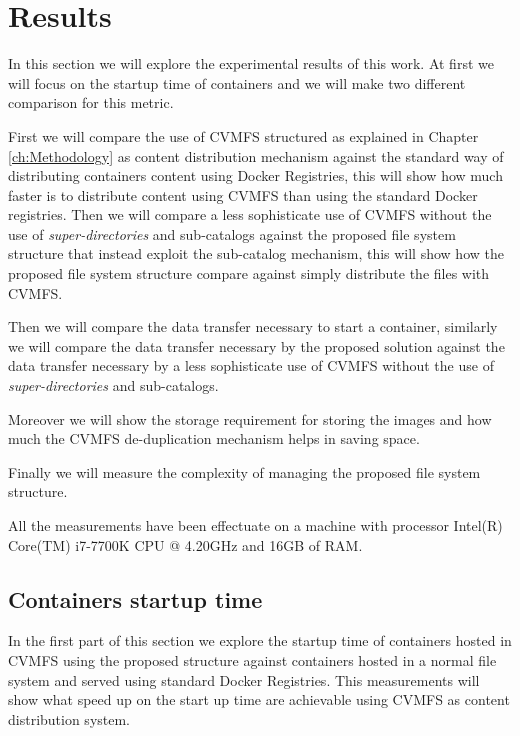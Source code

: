 \chapter{Results}\label{ch:Results}

In this section we will explore the experimental results of this work. At first
we will focus on the startup time of containers and we will make two different
comparison for this metric. 

First we will compare the use of CVMFS structured as explained in Chapter
\ref{ch:Methodology} as content distribution mechanism against the standard way
of distributing containers content using Docker Registries, this will show how
much faster is to distribute content using CVMFS than using the standard Docker
registries.  Then we will compare a less sophisticate use of CVMFS without the
use of \textit{super-directories} and sub-catalogs against the proposed file
system structure that instead exploit the sub-catalog mechanism, this will show
how the proposed file system structure compare against simply distribute the
files with CVMFS.

Then we will compare the data transfer necessary to start a container,
similarly we will compare the data transfer necessary by the proposed solution
against the data transfer necessary by a less sophisticate use of CVMFS without
the use of \textit{super-directories} and sub-catalogs.

Moreover we will show the storage requirement for storing the images and how
much the CVMFS de-duplication mechanism helps in saving space.

Finally we will measure the complexity of managing the proposed file system
structure.

All the measurements have been effectuate on a machine with processor Intel(R)
Core(TM) i7-7700K CPU @ 4.20GHz and 16GB of RAM.

\section{Containers startup time}

In the first part of this section we explore the startup time of containers
hosted in CVMFS using the proposed structure against containers hosted in a
normal file system and served using standard Docker Registries. This
measurements will show what speed up on the start up time are achievable using
CVMFS as content distribution system. 

